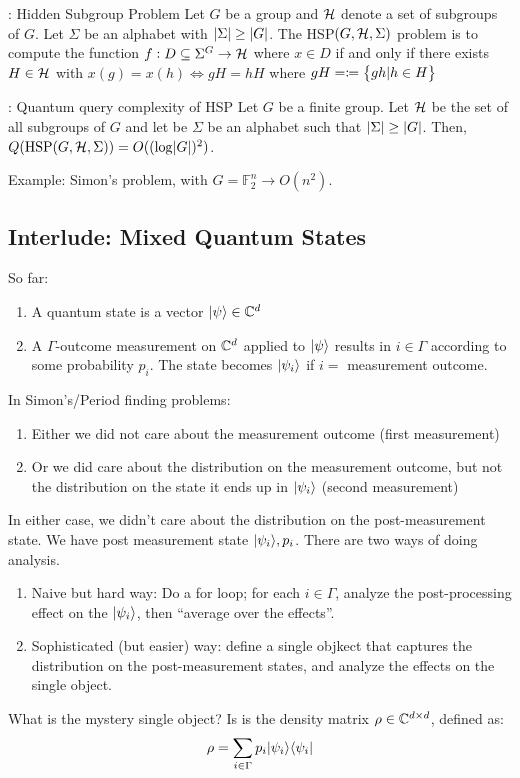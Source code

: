\begin{defbox}{: Hidden Subgroup Problem}
    Let $G$ be a group and $\mathcal{H}$ denote a set of subgroups of $G$. Let $\Sigma$ be an alphabet with $\lvert \Sigma \rvert \geq \lvert G \rvert$. The HSP$(G, \mathcal{H}, \Sigma)$ problem is to compute the function $f: D \subseteq \Sigma^G \to \mathcal{H}$ where $x \in D$ if and only if there exists $H \in \mathcal{H}$ with $x(g) = x(h) \iff gH = hH$ where $gH = \coloneqq \set{gh \vert h \in H}$
\end{defbox}

\begin{propbox}{: Quantum query complexity of HSP}
    \label{QComplexity-HSP}
    Let $G$ be a finite group. Let $\mathcal{H}$ be the set of all subgroups of $G$ and let be $\Sigma$ be an alphabet such that $\lvert \Sigma \rvert \geq \lvert G \rvert$. Then, $Q(\text{HSP}(G, \mathcal{H}, \Sigma)) = O((\log \lvert G \rvert)^2)$.
\end{propbox}

Example: Simon's problem, with $G = \mathbb{F}_2^n \to O(n^2)$. 

\subsection*{Interlude: Mixed Quantum States}
So far:
\begin{enumerate}
    \item A quantum state is a vector $\lvert \psi \rangle \in \mathbb{C}^d$
    \item A $\Gamma$-outcome measurement on $\mathbb{C}^d$ applied to $\lvert \psi \rangle$ results in $i \in \Gamma$ according to some probability $p_i$. The state becomes $\lvert \psi_i \rangle$ if $i =$ measurement outcome.
\end{enumerate}
In Simon's/Period finding problems:
\begin{enumerate}
    \item Either we did not care about the measurement outcome (first measurement)
    \item Or we did care about the distribution on the measurement outcome, but not the distribution on the state it ends up in $\lvert \psi_i \rangle$ (second measurement)
\end{enumerate}

In either case, we didn't care about the distribution on the post-measurement state. We have post measurement state $\lvert \psi_i \rangle, p_i$. There are two ways of doing analysis.
\begin{enumerate}
    \item Naive but hard way: Do a for loop; for each $i \in \Gamma$, analyze the post-processing effect on the $\lvert \psi_i \rangle$, then ``average over the effects''.
    \item Sophisticated (but easier) way: define a single objkect that captures the distribution on the post-measurement states, and analyze the effects on the single object.
\end{enumerate}

What is the mystery single object? Is is the density matrix $\rho \in \mathbb{C}^{d \times d}$, defined as:
\begin{equation}
    \rho = \sum_{i \in \Gamma}p_i \lvert \psi_i \rangle \langle \psi_i \rvert
\end{equation}